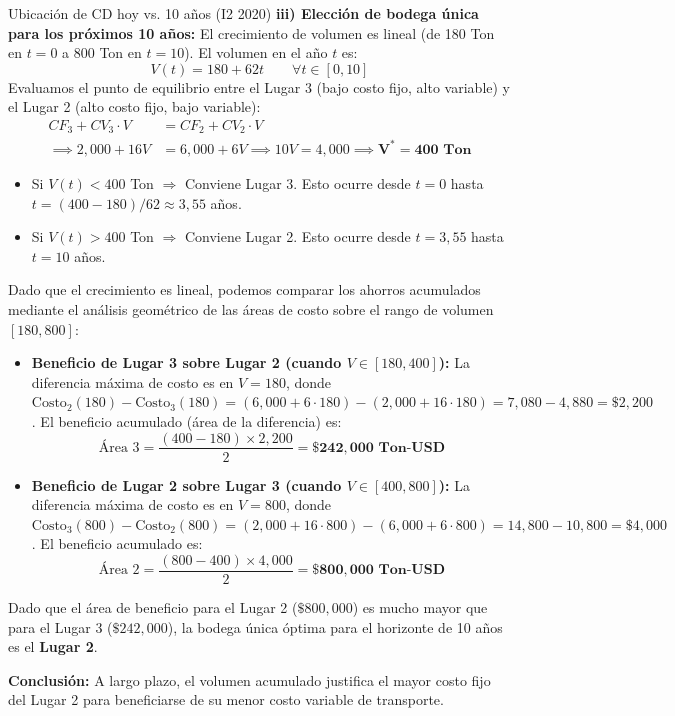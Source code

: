 \begin{ejercicio}{Ubicación de CD hoy vs. 10 años (I2 2020)}
\textbf{iii) Elección de bodega única para los próximos 10 años:}
El crecimiento de volumen es lineal (de 180 Ton en $t=0$ a 800 Ton en $t=10$). El volumen en el año $t$ es:
\[
  V(t) = 180 + 62t \qquad \forall t\in[0,10]
\]
Evaluamos el punto de equilibrio entre el Lugar 3 (bajo costo fijo, alto variable) y el Lugar 2 (alto costo fijo, bajo variable):
\begin{align*}
  CF_3 + CV_3 \cdot V &= CF_2 + CV_2 \cdot V \\
  \implies 2{,}000 + 16V &= 6{,}000 + 6V \implies 10V = 4{,}000 \implies \mathbf{V^* = 400\text{ Ton}}
\end{align*}
\begin{itemize}[leftmargin=1.4em, itemsep=2pt]
  \item Si $V(t) < 400$ Ton $\Rightarrow$ Conviene Lugar 3. Esto ocurre desde $t=0$ hasta $t = (400-180)/62 \approx 3{,}55$ años.
  \item Si $V(t) > 400$ Ton $\Rightarrow$ Conviene Lugar 2. Esto ocurre desde $t=3{,}55$ hasta $t=10$ años.
\end{itemize}
Dado que el crecimiento es lineal, podemos comparar los ahorros acumulados mediante el análisis geométrico de las áreas de costo sobre el rango de volumen $[180, 800]$:
\begin{itemize}[leftmargin=1.4em, itemsep=2pt]
  \item \textbf{Beneficio de Lugar 3 sobre Lugar 2 (cuando $V \in [180, 400]$):}
    La diferencia máxima de costo es en $V=180$, donde $\text{Costo}_2(180) - \text{Costo}_3(180) = (6{,}000+6\cdot180) - (2{,}000+16\cdot180) = 7{,}080 - 4{,}880 = \$2{,}200$.
    El beneficio acumulado (área de la diferencia) es:
    \[
      \text{Área 3} = \frac{(400 - 180) \times 2{,}200}{2} = \mathbf{\$242{,}000\text{ Ton-USD}}
    \]
  \item \textbf{Beneficio de Lugar 2 sobre Lugar 3 (cuando $V \in [400, 800]$):}
    La diferencia máxima de costo es en $V=800$, donde $\text{Costo}_3(800) - \text{Costo}_2(800) = (2{,}000+16\cdot800) - (6{,}000+6\cdot800) = 14{,}800 - 10{,}800 = \$4{,}000$.
    El beneficio acumulado es:
    \[
      \text{Área 2} = \frac{(800 - 400) \times 4{,}000}{2} = \mathbf{\$800{,}000\text{ Ton-USD}}
    \]
\end{itemize}
Dado que el área de beneficio para el Lugar 2 ($\$800{,}000$) es mucho mayor que para el Lugar 3 ($\$242{,}000$), la bodega única óptima para el horizonte de 10 años es el \textbf{Lugar 2}.

\textbf{Conclusión:} A largo plazo, el volumen acumulado justifica el mayor costo fijo del Lugar 2 para beneficiarse de su menor costo variable de transporte.
\end{ejercicio}



